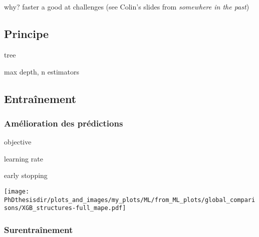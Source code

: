 \section{\XGBOOST}\label{chapter-ML-section-XGB}
why? faster a good at challenges (see Colin's slides from \emph{somewhere in the past})
\subsection{Principe}
tree

max depth, n estimators

\subsection{Entraînement}
\subsubsection{Amélioration des prédictions}

objective

learning rate

early stopping

\texttt{[image: \\PhDthesisdir/plots\_and\_images/my\_plots/ML/from\_ML\_plots/global\_comparisons/XGB\_structures-full\_mape.pdf]}



\subsubsection{Surentraînement}




